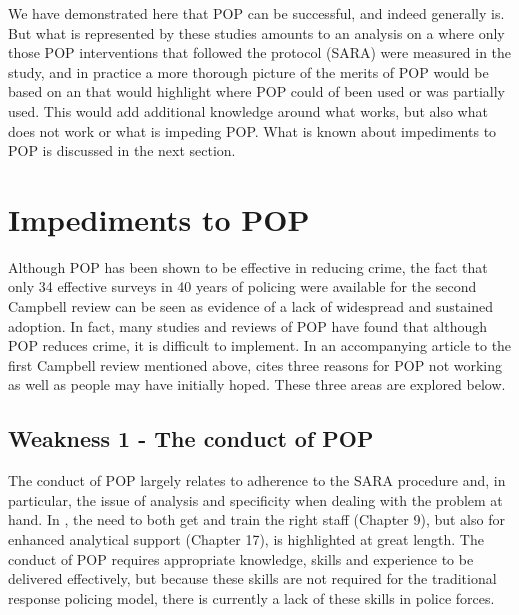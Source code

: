 We have demonstrated here that POP can be successful, and indeed generally is. But what is represented by these studies amounts to an analysis on a  where only those POP interventions that followed the protocol (SARA) were measured in the study, and in practice a more thorough picture of the merits of POP would be based on an  that would highlight where POP could of been used or was partially used. This would add additional knowledge around what works, but also what does not work or what is impeding POP.  What is known about impediments to POP is discussed in the next section.


\section{Impediments to POP} 



Although POP has been shown to be effective in reducing crime, the fact that only 34 effective surveys in 40 years of policing were available for the second Campbell review can be seen as evidence of a lack of widespread and sustained adoption. In fact, many studies and reviews of POP have found that although POP reduces crime, it is difficult to implement. In an accompanying article to the first Campbell review mentioned above, \textcite{whitherpop} cites three reasons for POP not working as well as people may have initially hoped. These three areas are explored below.



\subsection{Weakness 1 - The conduct of POP}  



The conduct of POP largely relates to adherence to the SARA procedure and, in particular, the issue of analysis and specificity when dealing with the problem at hand. In  \textcite{scott2012implementing}, the need to both get and train the right staff (Chapter 9), but also for enhanced analytical support (Chapter 17), is highlighted at great length. The conduct of POP requires appropriate knowledge, skills and experience to be delivered effectively, but because these skills are not required for the traditional response policing model, there is currently a lack of these skills in police forces.

